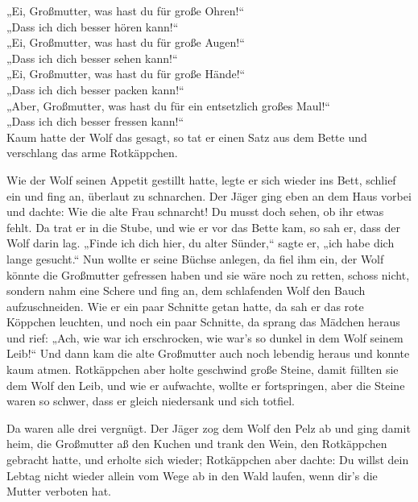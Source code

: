 \documentclass[12pt,a4paper]{article}
\begin{document}
„Ei, Großmutter, was hast du für große Ohren!“\\

„Dass ich dich besser hören kann!“\\

„Ei, Großmutter, was hast du für große Augen!“\\

„Dass ich dich besser sehen kann!“\\

„Ei, Großmutter, was hast du für große Hände!“\\

„Dass ich dich besser packen kann!“\\

„Aber, Großmutter, was hast du für ein entsetzlich großes Maul!“\\

„Dass ich dich besser fressen kann!“\\

Kaum hatte der Wolf das gesagt, so tat er einen Satz aus dem Bette und verschlang das arme Rotkäppchen.\par

Wie der Wolf seinen Appetit gestillt hatte, legte er sich wieder ins Bett, schlief ein und fing an, überlaut zu schnarchen. Der Jäger ging eben an dem Haus vorbei und dachte: Wie die alte Frau schnarcht! Du musst doch sehen, ob ihr etwas fehlt. Da trat er in die Stube, und wie er vor das Bette kam, so sah er, dass der Wolf darin lag. „Finde ich dich hier, du alter Sünder,“ sagte er, „ich habe dich lange gesucht.“ Nun wollte er seine Büchse anlegen, da fiel ihm ein, der Wolf könnte die Großmutter gefressen haben und sie wäre noch zu retten, schoss nicht, sondern nahm eine Schere und fing an, dem schlafenden Wolf den Bauch aufzuschneiden. Wie er ein paar Schnitte getan hatte, da sah er das rote Köppchen leuchten, und noch ein paar Schnitte, da sprang das Mädchen heraus und rief: „Ach, wie war ich erschrocken, wie war's so dunkel in dem Wolf seinem Leib!“ Und dann kam die alte Großmutter auch noch lebendig heraus und konnte kaum atmen. Rotkäppchen aber holte geschwind große Steine, damit füllten sie dem Wolf den Leib, und wie er aufwachte, wollte er fortspringen, aber die Steine waren so schwer, dass er gleich niedersank und sich totfiel.\par

Da waren alle drei vergnügt. Der Jäger zog dem Wolf den Pelz ab und ging damit heim, die Großmutter aß den Kuchen und trank den Wein, den Rotkäppchen gebracht hatte, und erholte sich wieder; Rotkäppchen aber dachte: Du willst dein Lebtag nicht wieder allein vom Wege ab in den Wald laufen, wenn dir's die Mutter verboten hat.\par
\end{document}
